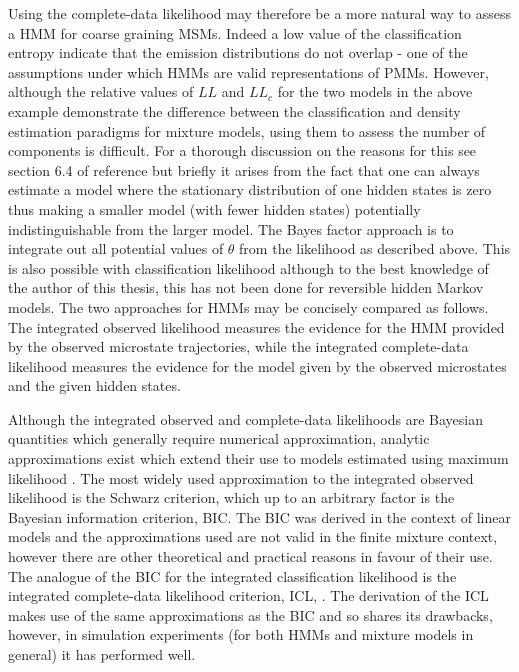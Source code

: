 Using the complete-data likelihood may therefore be a more natural way to assess a HMM for coarse graining MSMs. Indeed a low value of the classification entropy indicate that the emission distributions do not overlap - one of the assumptions under which HMMs are valid representations of PMMs. However, although the relative values of $LL$ and $LL_{c}$ for the two models in the above example demonstrate the difference between the classification and density estimation paradigms for mixture models, using them to assess the number of components is difficult. For a thorough discussion on the reasons for this see section 6.4 of reference \cite{mclachlanFiniteMixtureModels2000} but briefly it arises from the fact that one can always estimate a model where the stationary distribution of one hidden states is zero thus making a smaller model (with fewer hidden states) potentially indistinguishable from the larger model. The Bayes factor approach is to integrate out all potential values of $\theta$ from the likelihood as described above. This is also possible with classification likelihood\cite{latoucheBayesianMethodsGraph2010} although to the best knowledge of the author of this thesis, this has not been done for reversible hidden Markov models. The two approaches for HMMs may be concisely compared as follows. The integrated observed likelihood measures the evidence for the HMM provided by the observed microstate trajectories, while the integrated complete-data likelihood measures the evidence for the model  given by the observed microstates and the given hidden states. 

Although the integrated observed and complete-data likelihoods are Bayesian quantities which generally require numerical approximation, analytic approximations exist which extend their use to models estimated using maximum likelihood \cite{kassBayesFactors1995, mclachlanFiniteMixtureModels2000}. The most widely used approximation to the integrated observed likelihood is the Schwarz criterion\cite{schwarzEstimatingDimensionModel1978a}, which up to an arbitrary factor is the Bayesian information criterion, BIC. The BIC was derived in the context of linear models and the approximations used are not valid in the finite mixture context, however there are other theoretical and practical reasons in favour of their use\cite{fraley1998many}. The analogue of the BIC for the integrated classification likelihood is the integrated complete-data likelihood criterion, ICL, \cite{biernackiAssessingMixtureModel2000a}.  The derivation of the ICL makes use of the same approximations as the BIC and so shares its drawbacks, however, in simulation experiments (for both HMMs and mixture models in general) it has performed well. \cite{mclachlanFiniteMixtureModels2000,celeuxSelectingHiddenMarkov2008, biernackiAssessingMixtureModel2000a}

